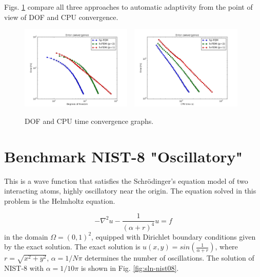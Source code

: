 \documentclass[12pt]{elsarticle}
\begin{document}
Figs. \ref{fig:nist-7-conv} compare all
three approaches to automatic adaptivity from the point
of view of DOF and CPU convergence.

\begin{figure}[H]
\centering
\includegraphics[height=4cm]{nist/nist-7/conv_dof_aniso.png}\ \
\includegraphics[height=4cm]{nist/nist-7/conv_cpu_aniso.png}
\caption{DOF and CPU time convergence graphs.}
\label{fig:nist-7-conv}
\end{figure}


\section{Benchmark NIST-8 "Oscillatory"}
\label{sec:bench-8}

This is a wave function that satisfies the Schr\"{o}dinger's equation model of two
interacting atoms, highly oscillatory near the origin.
The equation solved in this problem is the Helmholtz equation.

\begin{equation} \label{oscillatory}
-\nabla^{2} u - \frac{1}{(\alpha + r)^{4}} u = f
\end{equation}
in the domain $\Omega = (0, 1)^2$, equipped with Dirichlet boundary conditions
given by the exact solution. The exact solution is
$u(x,y) = sin(\frac{1}{\alpha + r})$,
where $r = \sqrt{x^{2} + y^{2}}$, $\alpha = 1 / N \pi$ determines the number of oscillations.
The solution of NIST-8 with $\alpha = 1 / 10 \pi$ is shown in Fig. \ref{fig:sln-nist08}.
\end{document}
